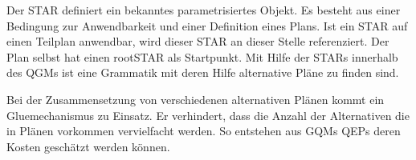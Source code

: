 Der \ac{STAR} definiert ein bekanntes parametrisiertes Objekt. Es besteht aus einer Bedingung zur Anwendbarkeit und einer Definition  eines Plans. Ist ein STAR auf einen Teilplan anwendbar, wird dieser STAR an dieser Stelle referenziert. Der Plan selbst hat einen rootSTAR als Startpunkt. Mit Hilfe der STARs innerhalb des \ac{QGM}s ist eine Grammatik mit deren Hilfe alternative Pläne zu finden sind. 

Bei der Zusammensetzung von verschiedenen alternativen Plänen kommt ein Gluemechanismus zu Einsatz. Er verhindert, dass die Anzahl der Alternativen die in Plänen vorkommen vervielfacht werden. So entstehen aus GQMs QEPs deren Kosten geschätzt werden können.

